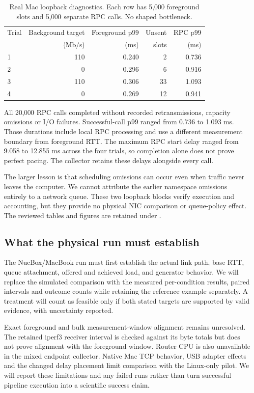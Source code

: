 \begin{table}[htbp]\centering
\caption{Real Mac loopback diagnostics. Each row has 5,000 foreground slots and
5,000 separate RPC calls. No shaped bottleneck.}\label{tab:loopback}
\begin{tabular}{lrrrr}\toprule
Trial & Background target & Foreground p99 & Unsent & RPC p99\\
 & (Mb/s) & (ms) & slots & (ms)\\\midrule
1 & 110 & 0.240 & 2 & 0.736\\
2 & 0 & 0.296 & 6 & 0.916\\
3 & 110 & 0.306 & 33 & 1.093\\
4 & 0 & 0.269 & 12 & 0.941\\\bottomrule
\end{tabular}
\end{table}

All 20,000 RPC calls completed without recorded retransmissions, capacity
omissions or I/O failures. Successful-call p99 ranged from 0.736 to 1.093 ms.
Those durations include local RPC processing and use a different measurement
boundary from foreground RTT. The maximum RPC start delay ranged from
9.058 to 12.855 ms across the four trials, so completion alone does not prove
perfect pacing. The collector retains these delays alongside every call.

The larger lesson is that scheduling omissions can occur even when traffic
never leaves the computer. We cannot attribute the earlier namespace
omissions entirely to a network queue. These two loopback blocks verify
execution and accounting, but they provide no physical NIC comparison or
queue-policy effect. The reviewed tables and figures are retained under
.

\subsection{What the physical run must establish}
The NucBox/MacBook run must first establish the actual link path, base RTT,
queue attachment, offered and achieved load, and generator behavior. We will
replace the simulated comparison with the measured per-condition results,
paired intervals and outcome counts while retaining the reference example
separately. A treatment will count as feasible only if both stated targets
are supported by valid evidence, with uncertainty reported.

Exact foreground and bulk measurement-window alignment remains unresolved.
The retained iperf3 receiver interval is checked against its byte totals but
does not prove alignment with the foreground window. Router CPU is also
unavailable in the mixed endpoint collector. Native Mac TCP behavior, USB
adapter effects and the changed delay placement limit comparison with the
Linux-only pilot. We will report these limitations and any failed runs rather
than turn successful pipeline execution into a scientific success claim.

